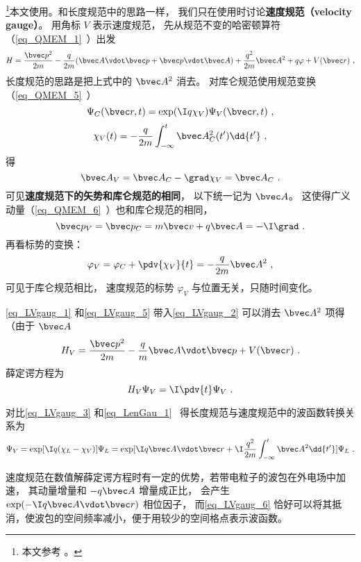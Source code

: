 

\footnote{本文参考 \cite{Bransden}。}本文使用。和长度规范中的思路一样， 我们只在使用时讨论\textbf{速度规范（velocity gauge）}。 用角标 $V$ 表示速度规范， 先从规范不变的哈密顿算符（\autoref{eq_QMEM_1}~）出发
\begin{equation}\label{eq_LVgaug_2}
H = \frac{\bvec p^2}{2m} - \frac{q}{2m} (\bvec A \vdot \bvec p + \bvec p \vdot \bvec A)
+ \frac{q^2}{2m} \bvec A^2 + q \varphi + V(\bvec r)~,
\end{equation}
长度规范的思路是把上式中的 $\bvec A^2$ 消去。 对库仑规范使用规范变换（\autoref{eq_QMEM_5}~）
\begin{equation}\label{eq_LVgaug_3}
\Psi_C(\bvec r, t) = \exp(\I q\chi_V)\Psi_V(\bvec r, t)~,
\end{equation}
\begin{equation}\label{eq_LVgaug_4}
\chi_V(t) = -\frac{q}{2m} \int_{-\infty}^t \bvec A_C^2(t') \dd{t'}~,
\end{equation}
得
\begin{equation}\label{eq_LVgaug_1}
\bvec A_V = \bvec A_C - \grad \chi_V = \bvec A_C~.
\end{equation}
可见\textbf{速度规范下的矢势和库仑规范的相同}， 以下统一记为 $\bvec A$。 这使得广义动量（\autoref{eq_QMEM_6}~）也和库仑规范的相同， 
\begin{equation}
\bvec p_V = \bvec p_C =  m \bvec v + q\bvec A = -\I \grad~.
\end{equation}
再看标势的变换：
\begin{equation}\label{eq_LVgaug_5}
\varphi_V = \varphi_C + \pdv{\chi_V}{t} = - \frac{q}{2m} \bvec A^2~,
\end{equation}
可见于库仑规范相比， 速度规范的标势 $\varphi_V$ 与位置无关，只随时间变化。

\autoref{eq_LVgaug_1} 和\autoref{eq_LVgaug_5} 带入\autoref{eq_LVgaug_2} 可以消去 $\bvec A^2$ 项得（由于 $\bvec A$ 
\begin{equation}
H_V = \frac{\bvec p^2}{2m} - \frac{q}{m} \bvec A \vdot \bvec p + V(\bvec r)~.
\end{equation}
薛定谔方程为
\begin{equation}\label{eq_LVgaug_7}
H_V \Psi_V = \I \pdv{t} \Psi_V~.
\end{equation}


对比\autoref{eq_LVgaug_3} 和\autoref{eq_LenGau_1}~ 得长度规范与速度规范中的波函数转换关系为
\begin{equation}\label{eq_LVgaug_6}
\Psi_V = \exp[\I q(\chi_L - \chi_V)]\Psi_L = \exp[\I q \bvec A\vdot \bvec r + \I\frac{q^2}{2m}\int_{-\infty}^t \bvec A^2\dd{t'}] \Psi_L~.
\end{equation}

速度规范在数值解薛定谔方程时有一定的优势，若带电粒子的波包在外电场中加速， 其动量增量和 $-q\bvec A$ 增量成正比， 会产生 $\exp(-\I q\bvec A\vdot\bvec r)$ 相位因子， 而\autoref{eq_LVgaug_6} 恰好可以将其抵消，使波包的空间频率减小，便于用较少的空间格点表示波函数。
